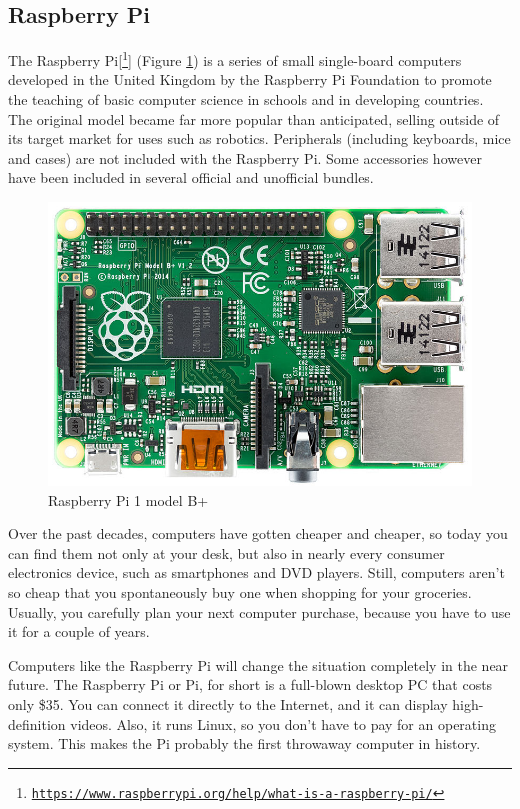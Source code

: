 \subsection{Raspberry Pi}

The Raspberry Pi[\footnote{\href{https://www.raspberrypi.org/help/what-is-a-raspberry-pi/}{\texttt{https://www.raspberrypi.org/help/what-is-a-raspberry-pi/}}}] (Figure \ref{fig:raspberry})  is a series of small single-board computers developed in the United Kingdom by the Raspberry Pi Foundation to promote the teaching of basic computer science in schools and in developing countries. The original model became far more popular than anticipated, selling outside of its target market for uses such as robotics. Peripherals (including keyboards, mice and cases) are not included with the Raspberry Pi. Some accessories however have been included in several official and unofficial bundles.
\newline
\begin{figure}[h]
	\centering
	\includegraphics[width=0.5\linewidth]{images/raspberrypi.jpg}
	\caption{Raspberry Pi 1 model B+}
	\label{fig:raspberry}
\end{figure}

Over the past decades, computers have gotten cheaper and cheaper, so today
you can find them not only at your desk, but also in nearly every consumer
electronics device, such as smartphones and DVD players. Still, computers
aren’t so cheap that you spontaneously buy one when shopping for your
groceries. Usually, you carefully plan your next computer purchase, because
you have to use it for a couple of years.
\newline

Computers like the Raspberry Pi will change the situation completely in the
near future. The Raspberry Pi or Pi, for short is a full-blown desktop PC
that costs only \$35. You can connect it directly to the Internet, and it can
display high-definition videos. Also, it runs Linux, so you don’t have to pay
for an operating system. This makes the Pi probably the first throwaway
computer in history.
\newline

